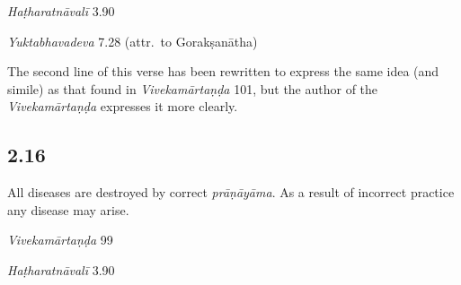 \begin{ekdosis}
\begin{testimonia}[hp02_015]
\emph{Haṭharatnāvalī} 3.90

\begin{versinnote}
\end{versinnote}

\emph{Yuktabhavadeva} 7.28 (attr.~to Gorakṣanātha)
\begin{versinnote}
\end{versinnote}

\end{testimonia}

\begin{philcomm}[hp02_015]
The second line of this verse has been rewritten to express the same idea (and simile) as that found in \emph{Viveka\-mārtaṇḍa} 101, but the author of the \emph{Viveka\-mārtaṇḍa} expresses it more clearly.
\end{philcomm}

\subsection*{2.16}
\begin{translation}[hp02_016]
All diseases are destroyed by correct \emph{prāṇāyāma}. As a result of incorrect practice any disease may arise.
\end{translation}

\begin{sources}[hp02_016]
\emph{Vivekamārtaṇḍa} 99

\begin{versinnote}
\end{versinnote}
\end{sources}

\begin{testimonia}[hp02_016]
\emph{Haṭharatnāvalī} 3.90

\begin{versinnote}
\end{versinnote}


\end{testimonia}
\end{ekdosis}
